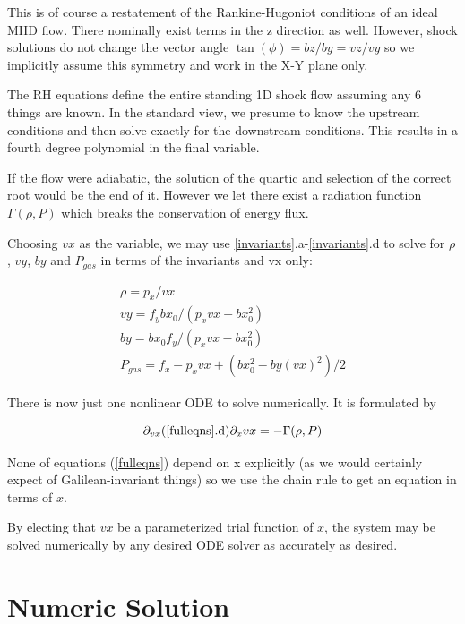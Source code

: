 \documentclass[letterpaper,12pt,twocolumn]{article}
\begin{document}
This is of course a restatement of the Rankine-Hugoniot conditions of an ideal MHD
flow. There nominally exist terms in the z direction as well. However, shock solutions 
do not change the vector angle $\tan(\phi) = bz/by = vz/vy$ so we implicitly 
assume this symmetry and work in the X-Y plane only.

The RH equations define the entire standing 1D shock flow assuming any 6 things are known.
In the standard view, we presume to know the upstream conditions and then solve exactly
for the downstream conditions. This results in a fourth degree polynomial in the final
variable.

If the flow were adiabatic, the solution of the quartic and selection of the correct
root would be the end of it.
However we let there exist a radiation function $\Gamma(\rho, P)$ which breaks the
conservation of energy flux.

Choosing $vx$ as the variable, we may use \ref{invariants}.a-\ref{invariants}.d to 
solve for $\rho$, $vy$, $by$ and $P_{gas}$ in terms of the invariants and vx only:

\begin{subequations}
\begin{align}
\rho = p_x / vx \\
vy = f_y bx_0 / (p_x vx - bx_0^2) \\
by = bx_0 f_y / (p_x vx - bx_0^2) \\
P_{gas} = f_x - p_x vx + (bx_0^2 - by(vx)^2)/2
\end{align}
\end{subequations}

There is now just one nonlinear ODE to solve numerically. It is formulated by

\begin{equation}
\partial_{vx} (\text{\ref{fulleqns}.d}) \partial_x vx = -\Gamma(\rho, P)
\end{equation}

None of equations (\ref{fulleqns}) depend on x explicitly (as we would certainly
expect of Galilean-invariant things) so we use the chain rule to get an equation
in terms of $x$.

By electing that $vx$ be a parameterized trial function of $x$, the system may be
solved numerically by any desired ODE solver as accurately as desired.

\section{Numeric Solution}
\end{document}
